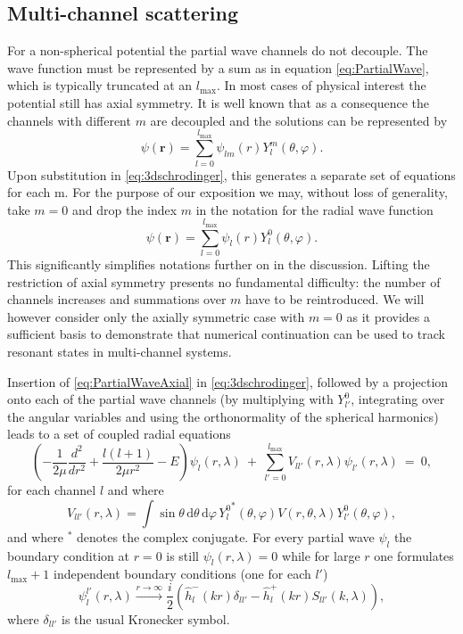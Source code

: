\documentclass[mathpazo]{cicp}
\begin{document}
\subsection{Multi-channel scattering}
For a non-spherical potential the partial wave channels do not decouple. The wave function must be represented by a sum as in equation \eqref{eq:PartialWave}, which is typically truncated at an $l_\text{max}$. In most cases of physical interest the potential still has axial symmetry. It is well known that as a consequence the channels with different $m$ are decoupled and the solutions can be represented by
\begin{equation}
	\psi(\mathbold{r}) = \sum_{l=0}^{l_\text{max}} \psi_{lm}(r) Y_{l}^{m}(\theta, \varphi).
	\label{eq:PartialWaveAxial0}
\end{equation}
Upon substitution in \eqref{eq:3dschrodinger}, this generates a separate set of equations for each m. For the purpose of our exposition we may, without loss of generality, take $m=0$ and drop the index $m$ in the notation for the radial wave function 
\begin{equation}
	\psi(\mathbold{r}) = \sum_{l=0}^{l_\text{max}} \psi_{l}(r) Y_{l}^{0}(\theta, \varphi).
	\label{eq:PartialWaveAxial}
\end{equation}
This significantly simplifies notations further on in the discussion. Lifting the restriction of axial symmetry presents no fundamental difficulty: the number of channels increases  and summations over $m$ have to be reintroduced. We will however consider only the axially symmetric case with $m=0$ as it provides a sufficient basis to demonstrate that numerical continuation can be used to track resonant states in multi-channel systems.

Insertion of \eqref{eq:PartialWaveAxial} in \eqref{eq:3dschrodinger}, followed by a projection onto each of the partial wave channels (by multiplying with $Y_{l'}^{0}$, integrating over the angular variables and using the orthonormality of the spherical harmonics) leads to a set of coupled radial equations 
\begin{equation}
	\label{eq:coupledchannel}
	\left(-\frac{1}{2\mu} \frac{d^2}{d r^2} + \frac{l(l+1)}{2\mu r^2} - E \right) \psi_{l}(r, \lambda) \ + \ \sum_{l'=0}^{l_\text{max}} V_{ll'}(r,\lambda) \psi_{l'}(r, \lambda) \ = \ 0,
\end{equation}
for each channel $l$ and where
\begin{equation}
	V_{ll'}(r,\lambda) = \int \sin\theta \, \text{d}\theta \, \text{d}\varphi \, {Y_{l}^{0}}^{*}(\theta, \varphi) V(r,\theta,\lambda) Y_{l'}^{0}(\theta,\varphi),
\end{equation}
and where $^{*}$ denotes the complex conjugate. For every partial wave $\psi_{l}$ the boundary condition at $r=0$ is still $\psi_{l}(r, \lambda) = 0$ while for large $r$ one formulates $l_{\text{max}}+1$ independent boundary conditions (one for each $l'$) 
\begin{equation}
	\label{eq:incomingpartial}
	\psi^{l'}_{l}(r, \lambda) \xrightarrow{r\to\infty} \frac{i}{2} \left( \hat{h}_{l}^{-}(kr) \delta_{ll'} - \hat{h}_{l}^{+}(kr) S_{ll'}(k, \lambda) \right),
\end{equation}
where $\delta_{ll'}$ is the usual Kronecker symbol.
\end{document}
